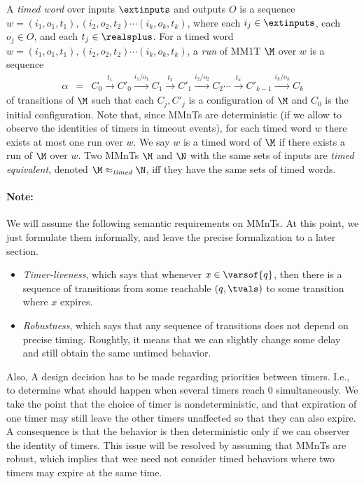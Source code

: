 A \emph{timed word} over inputs $\extinputs$ and outputs $O$ is a sequence
\\
$w = (i_1, o_1, t_1), (i_2, o_2, t_2) \cdots (i_k, o_k, t_k)$, where each $i_j \in \extinputs$, each $o_j \in O$, and each $t_j \in \realsplus$.
For a timed word $w = (i_1, o_1, t_1), (i_2, o_2, t_2) \cdots (i_k, o_k, t_k)$, a \emph{run} of MM1T $\M$ over $w$ is
a sequence 
\begin{eqnarray*}
\alpha & = & C_0 \xrightarrow{t_1} C'_0 \xrightarrow{i_1/o_1} C_1 \xrightarrow{t_2} C'_1 \xrightarrow{i_2/o_2} C_2 \cdots
\xrightarrow{t_k} C'_{k-1} \xrightarrow{i_k/o_k} C_{k}
\end{eqnarray*}
of transitions of $\M$ such that each $C_j, C'_j$ is a configuration of $\M$ and $C_0$ is the initial configuration.
Note that, since MMnTs are deterministic (if we allow to observe the
identities of timers in timeout events),
for each timed word $w$ there exists at most one run over $w$.
We say $w$ is a timed word of $\M$ if there exists a run of $\M$ over $w$.
Two MMnTs $\M$ and $\N$ with the same sets of inputs are \emph{timed equivalent}, denoted $\M \approx_{\mathit{timed}} \N$, iff 
they have the same sets of timed words.

\paragraph{Note:}
We will assume the following semantic requirements on MMnTs. At this point,
we just formulate them informally, and leave the precise formalization to
a later section.
\begin{itemize}
\item
    {\em Timer-liveness}, which says that whenever $x \in \varsof{q}$, then
  there is a sequence of transitions from some reachable $(q,\tvals)$ to some
  transition where $x$ expires.
\item
  {\em Robustness}, which says that any sequence of transitions does not
  depend on precise timing. Roughtly, it means that we can slightly change
  some delay and still obtain the same untimed behavior.
\end{itemize}
Also, A design decision has to be made regarding priorities between timers. I.e.,
to determine what should happen when several timers reach $0$ simultaneously.
We take the point that the choice of timer is nondeterministic, and that
expiration of one timer may still leave the other timers unaffected so that
they can also expire. A consequence is that the behavior is then deterministic
only if we can observer the identity of timers. This issue will be resolved
by assuming that MMnTs are robust, which implies that wee need not consider
timed behaviors where two timers may expire at the same time.

